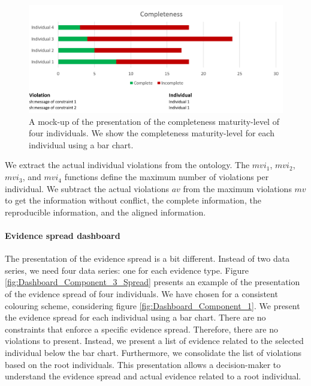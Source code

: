 \begin{figure}[H]
\centering
  \includegraphics[width=16cm]{../../Images/04_Contribution/04_DecisionPresentationPattern_Component3_Example_Completeness.png}
  \caption{A mock-up of the presentation of the completeness maturity-level of four individuals. We show the completeness maturity-level for each individual using a bar chart.}
  \label{fig:Dashboard_Component_3_Completeness}
\end{figure} 

We extract the actual individual violations from the ontology. The $mvi_1$, $mvi_2$, $mvi_3$, and $mvi_4$ functions define the maximum number of violations per individual. We subtract the actual violations $av$ from the maximum violations $mv$ to get the information without conflict, the complete information, the reproducible information, and the aligned information.

\paragraph{Evidence spread dashboard}
The presentation of the evidence spread is a bit different. Instead of two data series, we need four data series: one for each evidence type. Figure \ref{fig:Dashboard_Component_3_Spread} presents an example of the presentation of the evidence spread of four individuals. We have chosen for a consistent colouring scheme, considering figure \ref{fig:Dashboard_Component_1}. We present the evidence spread for each individual using a bar chart. There are no constraints that enforce a specific evidence spread. Therefore, there are no violations to present. Instead, we present a list of evidence related to the selected individual below the bar chart. Furthermore, we consolidate the list of violations based on the root individuals. This presentation allows a decision-maker to understand the evidence spread and actual evidence related to a root individual. 

